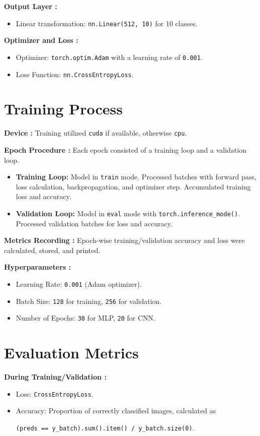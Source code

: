 \documentclass[12pt, a4paper]{report}
\begin{document}
\noindent \textbf{Output Layer :}
    \begin{itemize}
        \item Linear transformation: \texttt{nn.Linear(512, 10)} for 10 classes.
    \end{itemize}
    
\noindent \textbf{Optimizer and Loss :}
    \begin{itemize}
        \item Optimizer: \texttt{torch.optim.Adam} with a learning rate of \texttt{0.001}.
        \item Loss Function: \texttt{nn.CrossEntropyLoss}.
    \end{itemize}

\section{Training Process}
\noindent \textbf{Device :} Training utilized \texttt{cuda} if available, otherwise \texttt{cpu}.
    
\noindent \textbf{Epoch Procedure :} Each epoch consisted of a training loop and a validation loop.
    \begin{itemize}
        \item \textbf{Training Loop:} Model in \texttt{train} mode. Processed batches with forward pass, loss calculation, backpropagation, and optimizer step. Accumulated training loss and accuracy.
        \item \textbf{Validation Loop:} Model in \texttt{eval} mode with \texttt{torch.inference\_mode()}. Processed validation batches for loss and accuracy.
    \end{itemize}
    
    \noindent\textbf{Metrics Recording :} Epoch-wise training/validation accuracy and loss were calculated, stored, and printed.
    
    \noindent \textbf{Hyperparameters :}
    \begin{itemize}
        \item Learning Rate: \texttt{0.001} (Adam optimizer).
        \item Batch Size: \texttt{128} for training, \texttt{256} for validation.
        \item Number of Epochs: \texttt{30} for MLP, \texttt{20} for CNN.
    \end{itemize}

\section{Evaluation Metrics}
\noindent \textbf{During Training/Validation :}
    \begin{itemize}
        \item Loss: \texttt{CrossEntropyLoss}.
        \item Accuracy: Proportion of correctly classified images, calculated as 
        
        \texttt{(preds == y\_batch).sum().item() / y\_batch.size(0)}.
    \end{itemize}
    
\end{document}
